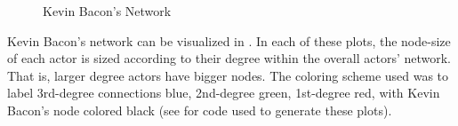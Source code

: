 \documentclass[11pt, fleqn]{article}\usepackage[]{graphicx}\usepackage[]{color}
\newenvironment{knitrout}{}{} %
\begin{document}
\begin{knitrout}
\color{fgcolor}\begin{figure}

{\centering {}

}

\caption[Kevin Bacon's Network]{Kevin Bacon's Network}\label{fig:bacon}
\end{figure}


\end{knitrout}

Kevin Bacon's network can be visualized in .  In each of these plots, the node-size of each actor is sized according to their degree within the overall actors' network.  That is, larger degree actors have bigger nodes.  The coloring scheme used was to label 3rd-degree connections blue, 2nd-degree green, 1st-degree red, with Kevin Bacon's node colored black (see  for code used to generate these plots).
\end{document}

